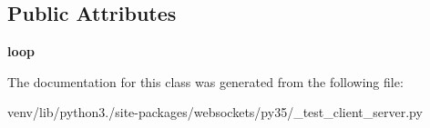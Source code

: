 \subsection*{Public Attributes}
\begin{DoxyCompactItemize}
\item 
\mbox{\label{classwebsockets_1_1py35_1_1__test__client__server_1_1_context_manager_tests_a03b51ffe7305989ec9e184a5a411472c}} 
{\bfseries loop}
\end{DoxyCompactItemize}


The documentation for this class was generated from the following file\+:\begin{DoxyCompactItemize}
\item 
venv/lib/python3./site-\/packages/websockets/py35/\+\_\+test\+\_\+client\+\_\+server.\+py\end{DoxyCompactItemize}
